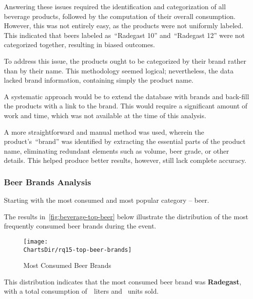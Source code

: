 Answering these issues required the identification and categorization of all beverage products, followed by the computation of their overall consumption.
However, this was not entirely easy, as the products were not uniformly labeled.
This indicated that beers labeled as~\enquote{Radegast 10} and~\enquote{Radegast 12} were not categorized together, resulting in biased outcomes.

To address this issue, the products ought to be categorized by their brand rather than by their name.
This methodology seemed logical; nevertheless, the data lacked brand information, containing simply the product name.

A systematic approach would be to extend the database with brands and back-fill the products with a link to the brand.
This would require a significant amount of work and time, which was not available at the time of this analysis.

A more straightforward and manual method was used, wherein the product's~\enquote{brand} was identified by extracting the essential parts of the product name, eliminating redundant elements such as volume, beer grade, or other details.
This helped produce better results, however, still lack complete accuracy.


\subsubsection{Beer Brands Analysis}
\label{subsubsec:analysis-beverage-popular-beer}
Starting with the most consumed and most popular category – beer.


The results in~\autoref{fig:beverage-top-beer} below illustrate the distribution of the most frequently consumed beer brands during the event.

\begin{figure}[H]
	\centering
	\texttt{[image: \\ChartsDir/rq15-top-beer-brands]}
	\caption{ Most Consumed Beer Brands}
	\label{fig:beverage-top-beer}
	\source
\end{figure}

This distribution indicates that the most consumed beer brand was \textbf{Radegast}, with a total consumption of~~liters and~ units sold.

